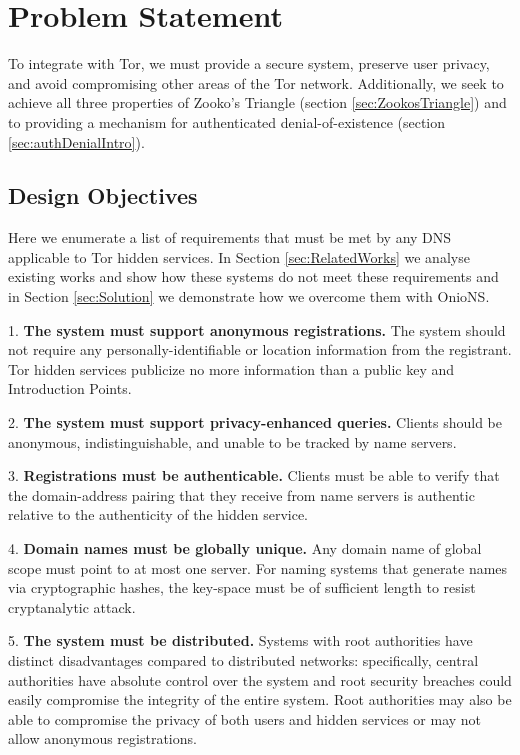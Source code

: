 \documentclass[conference]{IEEEtran}
\begin{document}
\section{Problem Statement}
\label{sec:problemStatement}

To integrate with Tor, we must provide a secure system, preserve user privacy, and avoid compromising other areas of the Tor network. Additionally, we seek to achieve all three properties of Zooko's Triangle (section \ref{sec:ZookosTriangle}) and to providing a mechanism for authenticated denial-of-existence (section \ref{sec:authDenialIntro}).

\subsection{Design Objectives}

Here we enumerate a list of requirements that must be met by any DNS applicable to Tor hidden services. In Section \ref{sec:RelatedWorks} we analyse existing works and show how these systems do not meet these requirements and in Section \ref{sec:Solution} we demonstrate how we overcome them with OnioNS.

1. \textbf{The system must support anonymous registrations.} The system should not require any personally-identifiable or location information from the registrant. Tor hidden services publicize no more information than a public key and Introduction Points.

2. \textbf{The system must support privacy-enhanced queries.} Clients should be anonymous, indistinguishable, and unable to be tracked by name servers.

3. \textbf{Registrations must be authenticable.} Clients must be able to verify that the domain-address pairing that they receive from name servers is authentic relative to the authenticity of the hidden service.

4. \textbf{Domain names must be globally unique.} Any domain name of global scope must point to at most one server. For naming systems that generate names via cryptographic hashes, the key-space must be of sufficient length to resist cryptanalytic attack.

5. \textbf{The system must be distributed.} Systems with root authorities have distinct disadvantages compared to distributed networks: specifically, central authorities have absolute control over the system and root security breaches could easily compromise the integrity of the entire system. Root authorities may also be able to compromise the privacy of both users and hidden services or may not allow anonymous registrations.
\end{document}
